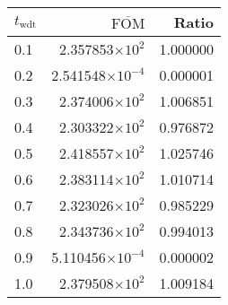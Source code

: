 \begin{tabular}{lrr}
\toprule
$t_{\mathrm{wdt}}$ & $\overline{\mathrm{FOM}}$ &    Ratio \\
\midrule
               0.1 &   2.357853$\times 10^{2}$ & 1.000000 \\
               0.2 &  2.541548$\times 10^{-4}$ & 0.000001 \\
               0.3 &   2.374006$\times 10^{2}$ & 1.006851 \\
               0.4 &   2.303322$\times 10^{2}$ & 0.976872 \\
               0.5 &   2.418557$\times 10^{2}$ & 1.025746 \\
               0.6 &   2.383114$\times 10^{2}$ & 1.010714 \\
               0.7 &   2.323026$\times 10^{2}$ & 0.985229 \\
               0.8 &   2.343736$\times 10^{2}$ & 0.994013 \\
               0.9 &  5.110456$\times 10^{-4}$ & 0.000002 \\
               1.0 &   2.379508$\times 10^{2}$ & 1.009184 \\
\bottomrule
\end{tabular}
